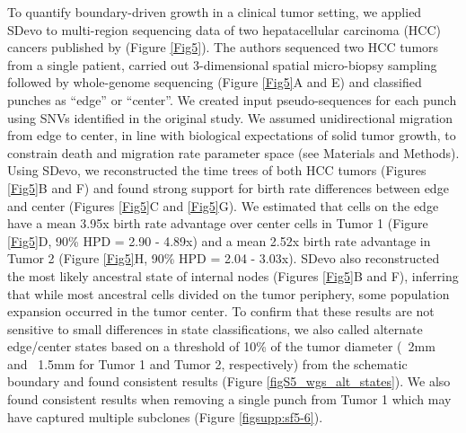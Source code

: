 \documentclass[12pt]{elife_based}
\begin{document}
To quantify boundary-driven growth in a clinical tumor setting, we applied SDevo to multi-region sequencing data of two hepatacellular carcinoma (HCC) cancers published by \cite{Li2022} (Figure \ref{Fig5}). The authors sequenced two HCC tumors from a single patient, carried out 3-dimensional spatial micro-biopsy sampling followed by whole-genome sequencing (Figure \ref{Fig5}A and E) and classified punches as ``edge'' or ``center''. We created input pseudo-sequences for each punch using SNVs identified in the original study. We assumed unidirectional migration from edge to center, in line with biological expectations of solid tumor growth, to constrain death and migration rate parameter space (see Materials and Methods). Using SDevo, we reconstructed the time trees of both HCC tumors (Figures \ref{Fig5}B and F) and found strong support for birth rate differences between edge and center (Figures \ref{Fig5}C and \ref{Fig5}G). We estimated that cells on the edge have a mean 3.95x birth rate advantage over center cells in Tumor 1 (Figure \ref{Fig5}D, 90\% HPD = 2.90 - 4.89x) and a mean 2.52x birth rate advantage in Tumor 2 (Figure \ref{Fig5}H, 90\% HPD = 2.04 - 3.03x). SDevo also reconstructed the most likely ancestral state of internal nodes (Figures \ref{Fig5}B and F), inferring that while most ancestral cells divided on the tumor periphery, some population expansion occurred in the tumor center. To confirm that these results are not sensitive to small differences in state classifications, we also called alternate edge/center states based on a threshold of 10\% of the tumor diameter (~2mm and ~1.5mm for Tumor 1 and Tumor 2, respectively) from the schematic boundary and found consistent results (Figure \ref{figS5_wgs_alt_states}). We also found consistent results when removing a single punch from Tumor 1 which may have captured multiple subclones (Figure \ref{figsupp:sf5-6}). 
\end{document}
